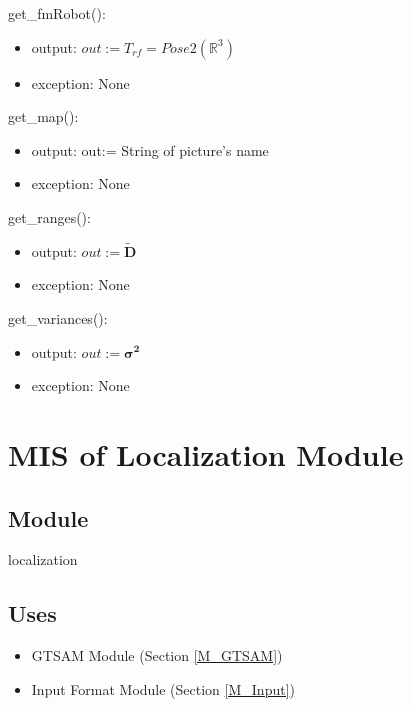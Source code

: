 \documentclass[12pt, titlepage]{article}
\begin{document}
\noindent get\_fmRobot():
\begin{itemize}
    \item output: $out:= T_{rf}=Pose2(\mathbb{R}^{3})$
    \item exception: None
\end{itemize}

\noindent get\_map():
\begin{itemize}
    \item output: out:=  String of picture's name  
    \item exception: None
\end{itemize}

\noindent get\_ranges():
\begin{itemize}
    \item output: $out:=\mathbf{\tilde{D}}$
    \item exception: None
\end{itemize}

\noindent get\_variances():
\begin{itemize}
    \item output: $out:=\boldsymbol{\sigma^2}$
    \item exception: None
\end{itemize}


\newpage

\section{MIS of Localization Module} \label{M_Localize}

\subsection{Module}

localization

\subsection{Uses}
\begin{itemize}
  \item GTSAM Module (Section \ref{M_GTSAM})
  \item Input Format Module (Section \ref{M_Input})
  
\end{itemize}
\end{document}
